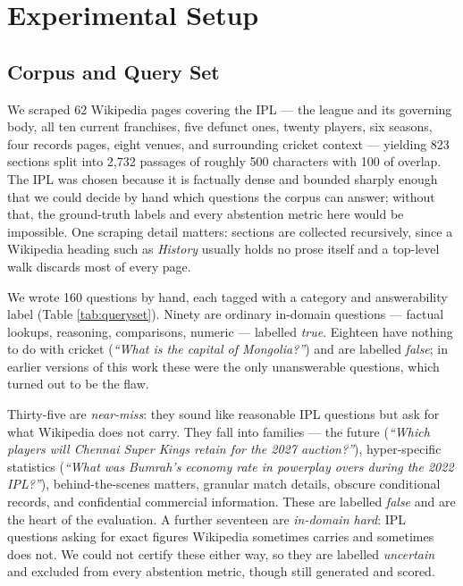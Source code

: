 \documentclass[conference]{IEEEtran}
\begin{document}
\section{Experimental Setup}

\subsection{Corpus and Query Set}

We scraped 62 Wikipedia pages covering the IPL --- the league and its governing body, all ten current franchises, five defunct ones, twenty players, six seasons, four records pages, eight venues, and surrounding cricket context --- yielding 823 sections split into 2{,}732 passages of roughly 500 characters with 100 of overlap. The IPL was chosen because it is factually dense and bounded sharply enough that we could decide by hand which questions the corpus can answer; without that, the ground-truth labels and every abstention metric here would be impossible. One scraping detail matters: sections are collected recursively, since a Wikipedia heading such as \emph{History} usually holds no prose itself and a top-level walk discards most of every page.

We wrote 160 questions by hand, each tagged with a category and answerability label (Table \ref{tab:queryset}). Ninety are ordinary in-domain questions --- factual lookups, reasoning, comparisons, numeric --- labelled \emph{true}. Eighteen have nothing to do with cricket (\emph{``What is the capital of Mongolia?''}) and are labelled \emph{false}; in earlier versions of this work these were the only unanswerable questions, which turned out to be the flaw.

Thirty-five are \emph{near-miss}: they sound like reasonable IPL questions but ask for what Wikipedia does not carry. They fall into families --- the future (\emph{``Which players will Chennai Super Kings retain for the 2027 auction?''}), hyper-specific statistics (\emph{``What was Bumrah's economy rate in powerplay overs during the 2022 IPL?''}), behind-the-scenes matters, granular match details, obscure conditional records, and confidential commercial information. These are labelled \emph{false} and are the heart of the evaluation. A further seventeen are \emph{in-domain hard}: IPL questions asking for exact figures Wikipedia sometimes carries and sometimes does not. We could not certify these either way, so they are labelled \emph{uncertain} and excluded from every abstention metric, though still generated and scored.
\end{document}
